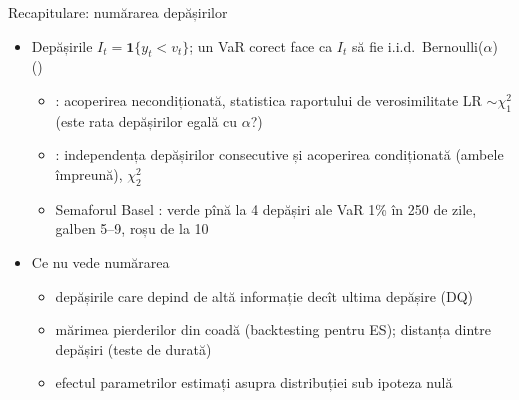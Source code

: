 \begin{frame}{Recapitulare: numărarea depășirilor}
\itemsize{\small}
\begin{itemize}
    \item Depășirile $I_t = \mathbf 1\{y_t < v_t\}$; un VaR corect face ca $I_t$ să fie i.i.d.\ Bernoulli($\alpha$) ()
    \begin{itemize}
        \item {}: acoperirea necondiționată, statistica raportului de verosimilitate LR $\sim \chi^2_1$ (este rata depășirilor egală cu $\alpha$?)
        \item {}: independența depășirilor consecutive și acoperirea condiționată (ambele împreună), $\chi^2_2$
        \item Semaforul Basel : verde pînă la 4 depășiri ale VaR 1\% în 250 de zile, galben 5--9, roșu de la 10
    \end{itemize}
    \item Ce nu vede numărarea
    \begin{itemize}
        \item depășirile care depind de altă informație decît ultima depășire (DQ)
        \item mărimea pierderilor din coadă (backtesting pentru ES); distanța dintre depășiri (teste de durată)
        \item efectul parametrilor estimați asupra distribuției sub ipoteza nulă
    \end{itemize}
\end{itemize}
\end{frame}

